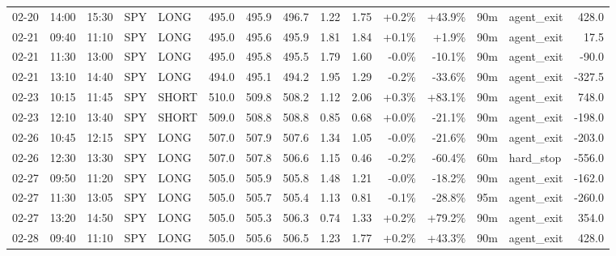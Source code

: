 \documentclass[11pt,a4paper,twoside]{article}
\begin{document}
\begin{landscape}
\begin{center}
\begin{longtable}{>{\color{txtmain}}l l l l l r r r r r r r r >{\color{txtmain}}l r}
02-20 & 14:00 & 15:30 & SPY & LONG & 495.0 & 495.9 & 496.7 & 1.22 & 1.75 & \textcolor{wingreen}{+0.2\%} & \textcolor{wingreen}{+43.9\%} & 90m & agent\_exit & \textcolor{wingreen}{428.0} \\
02-21 & 09:40 & 11:10 & SPY & LONG & 495.0 & 495.6 & 495.9 & 1.81 & 1.84 & \textcolor{wingreen}{+0.1\%} & \textcolor{wingreen}{+1.9\%} & 90m & agent\_exit & \textcolor{wingreen}{17.5} \\
02-21 & 11:30 & 13:00 & SPY & LONG & 495.0 & 495.8 & 495.5 & 1.79 & 1.60 & \textcolor{lossred}{-0.0\%} & \textcolor{lossred}{-10.1\%} & 90m & agent\_exit & \textcolor{lossred}{-90.0} \\
02-21 & 13:10 & 14:40 & SPY & LONG & 494.0 & 495.1 & 494.2 & 1.95 & 1.29 & \textcolor{lossred}{-0.2\%} & \textcolor{lossred}{-33.6\%} & 90m & agent\_exit & \textcolor{lossred}{-327.5} \\
02-23 & 10:15 & 11:45 & SPY & SHORT & 510.0 & 509.8 & 508.2 & 1.12 & 2.06 & \textcolor{wingreen}{+0.3\%} & \textcolor{wingreen}{+83.1\%} & 90m & agent\_exit & \textcolor{wingreen}{748.0} \\
02-23 & 12:10 & 13:40 & SPY & SHORT & 509.0 & 508.8 & 508.8 & 0.85 & 0.68 & \textcolor{wingreen}{+0.0\%} & \textcolor{lossred}{-21.1\%} & 90m & agent\_exit & \textcolor{lossred}{-198.0} \\
02-26 & 10:45 & 12:15 & SPY & LONG & 507.0 & 507.9 & 507.6 & 1.34 & 1.05 & \textcolor{lossred}{-0.0\%} & \textcolor{lossred}{-21.6\%} & 90m & agent\_exit & \textcolor{lossred}{-203.0} \\
02-26 & 12:30 & 13:30 & SPY & LONG & 507.0 & 507.8 & 506.6 & 1.15 & 0.46 & \textcolor{lossred}{-0.2\%} & \textcolor{lossred}{-60.4\%} & 60m & hard\_stop & \textcolor{lossred}{-556.0} \\
02-27 & 09:50 & 11:20 & SPY & LONG & 505.0 & 505.9 & 505.8 & 1.48 & 1.21 & \textcolor{lossred}{-0.0\%} & \textcolor{lossred}{-18.2\%} & 90m & agent\_exit & \textcolor{lossred}{-162.0} \\
02-27 & 11:30 & 13:05 & SPY & LONG & 505.0 & 505.7 & 505.4 & 1.13 & 0.81 & \textcolor{lossred}{-0.1\%} & \textcolor{lossred}{-28.8\%} & 95m & agent\_exit & \textcolor{lossred}{-260.0} \\
02-27 & 13:20 & 14:50 & SPY & LONG & 505.0 & 505.3 & 506.3 & 0.74 & 1.33 & \textcolor{wingreen}{+0.2\%} & \textcolor{wingreen}{+79.2\%} & 90m & agent\_exit & \textcolor{wingreen}{354.0} \\
02-28 & 09:40 & 11:10 & SPY & LONG & 505.0 & 505.6 & 506.5 & 1.23 & 1.77 & \textcolor{wingreen}{+0.2\%} & \textcolor{wingreen}{+43.3\%} & 90m & agent\_exit & \textcolor{wingreen}{428.0} \\

\end{longtable}
\end{center}
\end{landscape}
\end{document}
